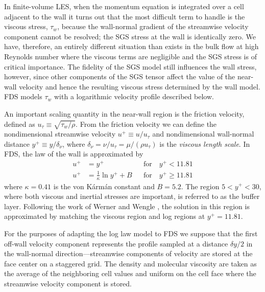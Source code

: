 In finite-volume LES, when the momentum equation is integrated over a cell adjacent to the wall it turns out that the most difficult term to handle is the viscous stress, $\tau_w$, because the wall-normal gradient of the streamwise velocity component cannot be resolved; the SGS stress at the wall is identically zero.  We have, therefore, an entirely different situation than exists in the bulk flow at high Reynolds number where the viscous terms are negligible and the SGS stress is of critical importance.  The fidelity of the SGS model still influences the wall stress, however, since other components of the SGS tensor affect the value of the near-wall velocity and hence the resulting viscous stress determined by the wall model. FDS models $\tau_w$ with a logarithmic velocity profile \cite{Pope:2000} described below.

An important scaling quantity in the near-wall region is the friction velocity, defined as $u_\tau \equiv \sqrt{\tau_w/\rho}$.
From the friction velocity we can define the nondimensional streamwise velocity $u^+ \equiv u/u_\tau$ and nondimensional wall-normal distance $y^+ \equiv y/\delta_\nu$, where $\delta_\nu = \nu/u_\tau = \mu/(\rho u_\tau)$ is the \emph{viscous length scale}. In FDS, the law of the wall is approximated by
\begin{align}
\label{eqn_visclayer} u^+ &= y^+                           && \mbox{for} \quad y^+ < 11.81 \\
\label{eqn_loglaw}    u^+ &= \frac{1}{\kappa} \ln y^+ + B  && \mbox{for} \quad y^+ \ge 11.81
\end{align}
where $\kappa = 0.41$ is the von K\'arm\'an constant and $B=5.2$.  The region $5 < y^+ < 30$, where both viscous and inertial stresses are important, is referred to as the buffer layer.  Following the work of Werner and Wengle \cite{Werner:1991}, the solution in this region is approximated by matching the viscous region and log regions at $y^+ = 11.81$.


For the purposes of adapting the log law model to FDS we suppose that the first off-wall velocity component represents the profile sampled at a distance $\delta y/2$ in the wall-normal direction---streamwise components of velocity are stored at the face center on a staggered grid.  The density and molecular viscosity are taken as the average of the neighboring cell values and uniform on the cell face where the streamwise velocity component is stored.

